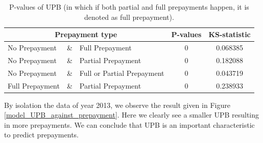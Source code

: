         \begin{table}[H]
        \centering
            \begin{tabular}{lcl|c|c}
            \multicolumn{3}{c}{Prepayment type} & P-values& KS-statistic \\\hline
            No Prepayment & \& & Full Prepayment & 0 & 0.068385\\
            No Prepayment & \& & Partial Prepayment & 0 & 0.182088\\
            No Prepayment & \& & Full or Partial Prepayment & 0 & 0.043719 \\
            Full Prepayment & \& & Partial Prepayment & 0 & 0.238933
		    \end{tabular}
            \caption{P-values of UPB (in which if both partial and full prepayments happen, it is denoted as full prepayment).}
	        \label{model_Pvals_of_UPB}
        \end{table}
        \noindent
        By isolation the data of year 2013, we observe the result given in Figure         \ref{model_UPB_against_prepayment}. Here we clearly see a smaller UPB resulting in more prepayments. We can conclude that UPB is an important characteristic to predict prepayments. 
